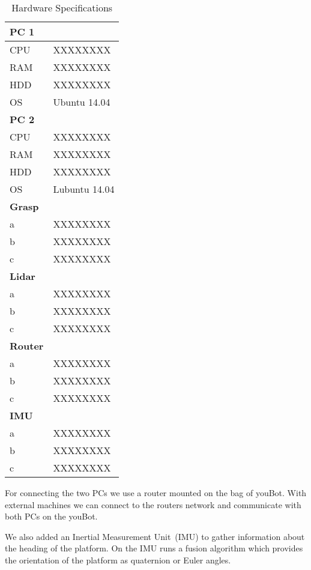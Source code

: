 \begin{table}[htbp]
	\label{tab:hw}
	\caption{Hardware Specifications}
	\centering
	\begin{tabular}{ | p{2cm} | p{3cm} | }
		\hline
		\bfseries{PC 1} &  \\
		\hline
		CPU & XXXXXXXX \\
		RAM & XXXXXXXX \\
		HDD & XXXXXXXX \\
		OS & Ubuntu 14.04 \\
		\hline \hline
		\bfseries{PC 2} &  \\
		\hline
		CPU & XXXXXXXX \\
		RAM & XXXXXXXX \\
		HDD & XXXXXXXX \\
		OS & Lubuntu 14.04 \\
		\hline \hline
		\bfseries{Grasp} &  \\
		\hline
		a & XXXXXXXX \\
		b & XXXXXXXX \\
		c & XXXXXXXX \\
		\hline \hline
		\bfseries{Lidar} &  \\
		\hline
		a & XXXXXXXX \\
		b & XXXXXXXX \\
		c & XXXXXXXX \\
		\hline \hline
		\bfseries{Router} &  \\
		\hline
		a & XXXXXXXX \\
		b & XXXXXXXX \\
		c & XXXXXXXX \\
		\hline \hline
		\bfseries{IMU} &  \\
		\hline
		a & XXXXXXXX \\
		b & XXXXXXXX \\
		c & XXXXXXXX \\
		\hline
	\end{tabular}
	\label{tab:hw}
\end{table}

For connecting the two PCs we use a router mounted on the bag of youBot. With external machines we can connect to the routers network and communicate with both PCs on the youBot.

We also added an Inertial Measurement Unit~(IMU) to gather information about the heading of the platform. On the IMU runs a fusion algorithm which provides the orientation of the platform as quaternion or Euler angles.

\clearpage
